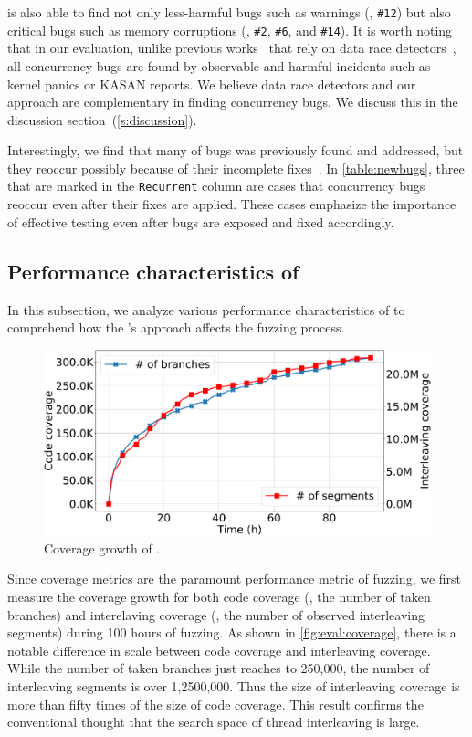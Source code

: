 \sys is also able to find not only less-harmful bugs such as warnings
(\eg, \texttt{\#12}) but also critical bugs such as memory corruptions
(\eg, \texttt{\#2}, \texttt{\#6}, and \texttt{\#14}).
%
It is worth noting that in our evaluation, unlike previous
works~\cite{snowboard, krace} that rely on data race
detectors~\cite{kcsan, tsan}, all concurrency bugs are found by
observable and harmful incidents such as kernel panics or KASAN
reports.
%
\dr{}
We believe data race detectors and our approach are complementary in
finding concurrency bugs. We discuss this in the discussion
section~(\autoref{s:discussion}).

Interestingly, we find that many of bugs was previously found and
addressed, but they reoccur possibly because of their incomplete
fixes~\cite{learningfrommistakes}.
%
In \autoref{table:newbugs}, three that are marked in the
\texttt{Recurrent} column are cases that concurrency bugs reoccur even
after their fixes are applied.
%
These cases emphasize the importance of effective testing even after
bugs are exposed and fixed accordingly.






\subsection{Performance characteristics of \sys}
\label{ss:characteristics}

In this subsection, we analyze various performance characteristics of
\sys to comprehend how the \sys's approach affects the fuzzing
process.

%
\begin{figure}[t]
  \centering
  \includegraphics[width=\linewidth]{fig/coverage_graph-crop.pdf}
  \caption{Coverage growth of \sys.}
  \label{fig:eval:coverage}
\end{figure}
%
Since coverage metrics are the paramount performance metric of
fuzzing, we first measure the coverage growth for both code coverage
(\ie, the number of taken branches) and interelaving coverage (\ie,
the number of observed interleaving segments) during 100 hours of
fuzzing.
%
As shown in \autoref{fig:eval:coverage}, there is a notable difference
in scale between code coverage and interleaving coverage.
%
While the number of taken branches just reaches to 250,000, the number
of interleaving segments is over 1,2500,000. Thus the size of
interleaving coverage is more than fifty times of the size of code
coverage.
%
This result confirms the conventional thought that the search space of
thread interleaving is large.
%

